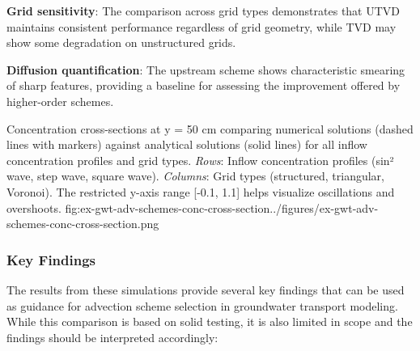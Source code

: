 \textbf{Grid sensitivity}: The comparison across grid types demonstrates that UTVD maintains consistent performance regardless of grid geometry, while TVD may show some degradation on unstructured grids.

\textbf{Diffusion quantification}: The upstream scheme shows characteristic smearing of sharp features, providing a baseline for assessing the improvement offered by higher-order schemes.

\begin{StandardFigure}{
    Concentration cross-sections at y = 50 cm comparing numerical solutions (dashed lines with markers) against analytical solutions (solid lines) for all inflow concentration profiles and grid types. \textit{Rows}: Inflow concentration profiles (sin² wave, step wave, square wave). \textit{Columns}: Grid types (structured, triangular, Voronoi). The restricted y-axis range [-0.1, 1.1] helps visualize oscillations and overshoots.
}{fig:ex-gwt-adv-schemes-conc-cross-section}{../figures/ex-gwt-adv-schemes-conc-cross-section.png}
\end{StandardFigure}

\subsubsection{Key Findings}

The results from these simulations provide several key findings that can be used as guidance for advection scheme selection in groundwater transport modeling. While this comparison is based on solid testing, it is also limited in scope and the findings should be interpreted accordingly:

